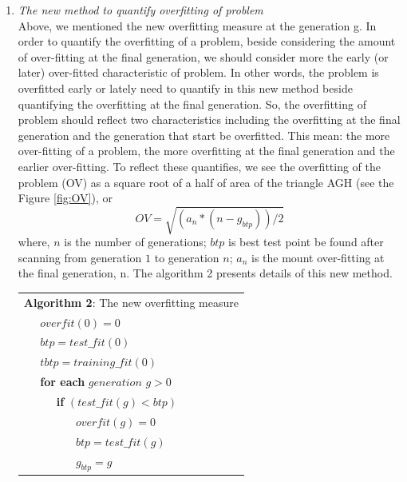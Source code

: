 \begin{enumerate}
\begin{enumerate}
\item \textit{The new method to quantify overfitting of problem} \\
Above, we mentioned the new overfitting measure at the generation g. In order to quantify the overfitting of a problem, beside considering the amount of over-fitting  at the final generation, we should consider more the early (or later) over-fitted characteristic of problem. In other words, the problem is overfitted early or lately need to quantify in this new method beside quantifying the overfitting at the final generation. So, the overfitting of problem should reflect two characteristics including the overfitting at the final generation and the generation that start be overfitted. This mean: the more over-fitting of a problem, the more overfitting at the final generation and the earlier over-fitting. To reflect these quantifies, we see the overfitting of the problem (OV) as a square root of a half of area of the triangle AGH (see the Figure \ref{fig:OV}), or 
\begin{equation}
OV=\sqrt{(a_{n}*(n-{g}_{btp}))/2} 
\end{equation}
where, $n$ is the number of generations; $btp$ is best test point be found after scanning from generation $1$ to generation $n$;  $a_{n}$ is the mount over-fitting at the final generation, n. The algorithm 2 presents details of this new method.
\begin{table}
\begin{tabular}{lllllllllll}
\multicolumn{11}{l}{\textbf{Algorithm 2}: The new overfitting measure} \\
\multicolumn{1}{l|}{} & \multicolumn{10}{l}{$overfit(0) = 0$} \\
\multicolumn{1}{l|}{} & \multicolumn{10}{l}{$btp = test\_fit(0)$} \\
\multicolumn{1}{l|}{} & \multicolumn{10}{l}{$tbtp = training\_fit(0)$} \\
\multicolumn{1}{l|}{} & \multicolumn{10}{l}{\textbf{for each } $generation$ $g>0$ } \\
\multicolumn{1}{l|}{} & \multicolumn{1}{l|}{} & \multicolumn{9}{l}{  \textbf{if} $(test\_fit(g) < btp)$} \\
\multicolumn{1}{l|}{} & \multicolumn{1}{l|}{} & \multicolumn{1}{l|}{} & \multicolumn{8}{l}{$overfit(g)= 0$} \\
\multicolumn{1}{l|}{} & \multicolumn{1}{l|}{} & \multicolumn{1}{l|}{} & \multicolumn{8}{l}{$btp = test\_fit(g)$} \\
\multicolumn{1}{l|}{} & \multicolumn{1}{l|}{} & \multicolumn{1}{l|}{} & \multicolumn{8}{l}{${g}_{btp}= g$} \\

\end{tabular}
\end{table}
\end{enumerate}
\end{enumerate}
